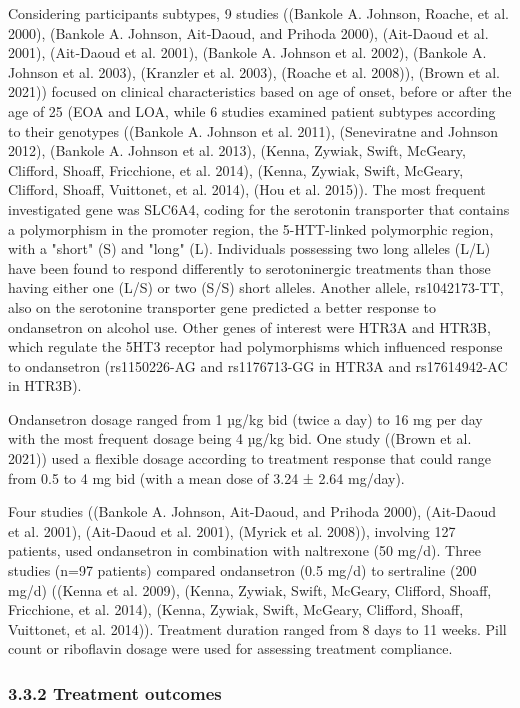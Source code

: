 \documentclass[
  12pt,
]{article}
\begin{document}
Considering participants subtypes, 9 studies ((Bankole A. Johnson,
Roache, et al. 2000), (Bankole A. Johnson, Ait‐Daoud, and Prihoda 2000),
(Ait-Daoud et al. 2001), (Ait‐Daoud et al. 2001), (Bankole A. Johnson et
al. 2002), (Bankole A. Johnson et al. 2003), (Kranzler et al. 2003),
(Roache et al. 2008)), (Brown et al. 2021)) focused on clinical
characteristics based on age of onset, before or after the age of 25
(EOA and LOA, while 6 studies examined patient subtypes according to
their genotypes ((Bankole A. Johnson et al. 2011), (Seneviratne and
Johnson 2012), (Bankole A. Johnson et al. 2013), (Kenna, Zywiak, Swift,
McGeary, Clifford, Shoaff, Fricchione, et al. 2014), (Kenna, Zywiak,
Swift, McGeary, Clifford, Shoaff, Vuittonet, et al. 2014), (Hou et al.
2015)). The most frequent investigated gene was SLC6A4, coding for the
serotonin transporter that contains a polymorphism in the promoter
region, the 5-HTT-linked polymorphic region, with a "short" (S) and
"long" (L). Individuals possessing two long alleles (L/L) have been
found to respond differently to serotoninergic treatments than those
having either one (L/S) or two (S/S) short alleles. Another allele,
rs1042173-TT, also on the serotonine transporter gene predicted a better
response to ondansetron on alcohol use. Other genes of interest were
HTR3A and HTR3B, which regulate the 5HT3 receptor had polymorphisms
which influenced response to ondansetron (rs1150226-AG and rs1176713-GG
in HTR3A and rs17614942-AC in HTR3B).

Ondansetron dosage ranged from 1 µg/kg bid (twice a day) to 16 mg per
day with the most frequent dosage being 4 µg/kg bid. One study ((Brown
et al. 2021)) used a flexible dosage according to treatment response
that could range from 0.5 to 4 mg bid (with a mean dose of 3.24 ± 2.64
mg/day).

Four studies ((Bankole A. Johnson, Ait‐Daoud, and Prihoda 2000),
(Ait-Daoud et al. 2001), (Ait‐Daoud et al. 2001), (Myrick et al. 2008)),
involving 127 patients, used ondansetron in combination with naltrexone
(50 mg/d). Three studies (n=97 patients) compared ondansetron (0.5 mg/d)
to sertraline (200 mg/d) ((Kenna et al. 2009), (Kenna, Zywiak, Swift,
McGeary, Clifford, Shoaff, Fricchione, et al. 2014), (Kenna, Zywiak,
Swift, McGeary, Clifford, Shoaff, Vuittonet, et al. 2014)). Treatment
duration ranged from 8 days to 11 weeks. Pill count or riboflavin dosage
were used for assessing treatment compliance.

\subsubsection{3.3.2 Treatment outcomes}\label{treatment-outcomes}
\end{document}

